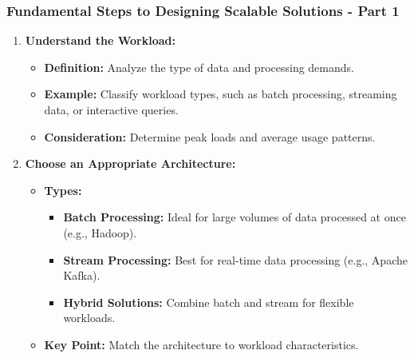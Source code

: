 \documentclass[aspectratio=169]{beamer}
\begin{document}
\begin{frame}[fragile]
    \frametitle{Fundamental Steps to Designing Scalable Solutions - Part 1}
    \begin{enumerate}
        \item \textbf{Understand the Workload:}
            \begin{itemize}
                \item \textbf{Definition:} Analyze the type of data and processing demands.
                \item \textbf{Example:} Classify workload types, such as batch processing, streaming data, or interactive queries.
                \item \textbf{Consideration:} Determine peak loads and average usage patterns.
            \end{itemize}
        
        \item \textbf{Choose an Appropriate Architecture:}
            \begin{itemize}
                \item \textbf{Types:}
                    \begin{itemize}
                        \item \textbf{Batch Processing:} Ideal for large volumes of data processed at once (e.g., Hadoop).
                        \item \textbf{Stream Processing:} Best for real-time data processing (e.g., Apache Kafka).
                        \item \textbf{Hybrid Solutions:} Combine batch and stream for flexible workloads.
                    \end{itemize}
                \item \textbf{Key Point:} Match the architecture to workload characteristics.
            \end{itemize}
    \end{enumerate}
\end{frame}
\end{document}
